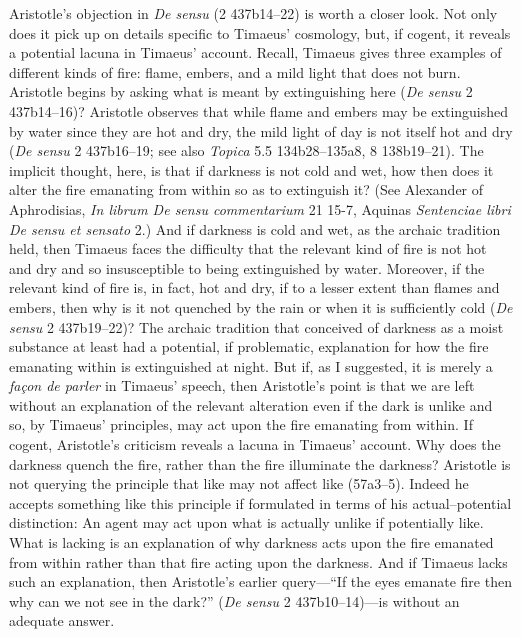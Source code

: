 Aristotle's objection in \emph{De sensu} (2 437b14–22) is worth a closer look. Not only does it pick up on details specific to Timaeus' cosmology, but, if cogent, it reveals a potential lacuna in Timaeus' account. Recall, Timaeus gives three examples of different kinds of fire: flame, embers, and a mild light that does not burn. Aristotle begins by asking what is meant by extinguishing here (\emph{De sensu} 2 437b14--16)? Aristotle observes that while flame and embers may be extinguished by water since they are hot and dry, the mild light of day is not itself hot and dry (\emph{De sensu} 2 437b16--19; see also \emph{Topica} 5.5 134b28--135a8, 8 138b19--21). The implicit thought, here, is that if darkness is not cold and wet, how then does it alter the fire emanating from within so as to extinguish it? (See Alexander of Aphrodisias, \emph{In librum De sensu commentarium} 21 15-7, Aquinas \emph{Sentenciae libri De sensu et sensato} 2.) And if darkness is cold and wet, as the archaic tradition held, then Timaeus faces the difficulty that the relevant kind of fire is not hot and dry and so insusceptible to being extinguished by water. Moreover, if the relevant kind of fire is, in fact, hot and dry, if to a lesser extent than flames and embers, then why is it not quenched by the rain or when it is sufficiently cold (\emph{De sensu} 2 437b19--22)? The archaic tradition that conceived of darkness as a moist substance at least had a potential, if problematic, explanation for how the fire emanating within is extinguished at night. But if, as I suggested, it is merely a \emph{façon de parler} in Timaeus' speech, then Aristotle's point is that we are left without an explanation of the relevant alteration even if the dark is unlike and so, by Timaeus' principles, may act upon the fire emanating from within. If cogent, Aristotle's criticism reveals a lacuna in Timaeus' account. Why does the darkness quench the fire, rather than the fire illuminate the darkness? Aristotle is not querying the principle that like may not affect like (57a3–5). Indeed he accepts something like this principle if formulated in terms of his actual--potential distinction: An agent may act upon what is actually unlike if potentially like. What is lacking is an explanation of why darkness acts upon the fire emanated from within rather than that fire acting upon the darkness. And if Timaeus lacks such an explanation, then Aristotle's earlier query---``If the eyes emanate fire then why can we not see in the dark?'' (\emph{De sensu} 2 437b10--14)---is without an adequate answer.

